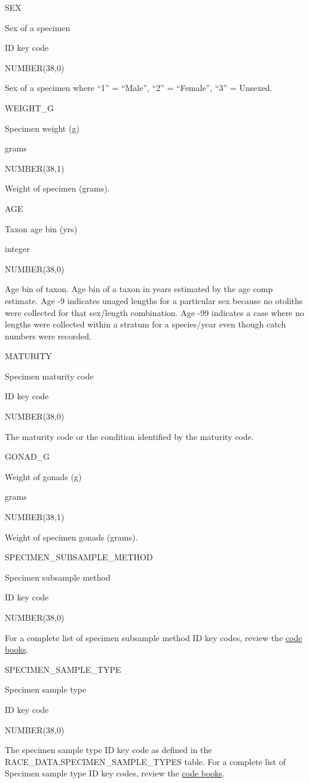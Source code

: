\documentclass[
  letterpaper,
  oneside,
  open=any]{scrbook}
\begin{document}
SEX

Sex of a specimen

ID key code

NUMBER(38,0)

Sex of a specimen where ``1'' = ``Male'', ``2'' = ``Female'', ``3'' =
Unsexed.

WEIGHT\_G

Specimen weight (g)

grams

NUMBER(38,1)

Weight of specimen (grams).

AGE

Taxon age bin (yrs)

integer

NUMBER(38,0)

Age bin of taxon. Age bin of a taxon in years estimated by the age comp
estimate. Age -9 indicates unaged lengths for a particular sex because
no otoliths were collected for that sex/length combination. Age -99
indicates a case where no lengths were collected within a stratum for a
species/year even though catch numbers were recorded.

MATURITY

Specimen maturity code

ID key code

NUMBER(38,0)

The maturity code or the condition identified by the maturity code.

GONAD\_G

Weight of gonads (g)

grams

NUMBER(38,1)

Weight of specimen gonads (grams).

SPECIMEN\_SUBSAMPLE\_METHOD

Specimen subsample method

ID key code

NUMBER(38,0)

For a complete list of specimen subsample method ID key codes, review
the
\href{https://www.fisheries.noaa.gov/resource/document/groundfish-survey-species-code-manual-and-data-codes-manual}{code
books}.

SPECIMEN\_SAMPLE\_TYPE

Specimen sample type

ID key code

NUMBER(38,0)

The specimen sample type ID key code as defined in the
RACE\_DATA.SPECIMEN\_SAMPLE\_TYPES table. For a complete list of
Specimen sample type ID key codes, review the
\href{https://www.fisheries.noaa.gov/resource/document/groundfish-survey-species-code-manual-and-data-codes-manual}{code
books}.
\end{document}
